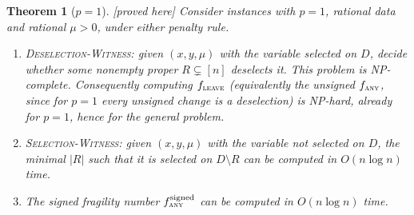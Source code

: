 \documentclass[10pt,a4paper]{article}
\theoremstyle{plain}
\newtheorem{theorem}{Theorem}[section]
\theoremstyle{definition}
\theoremstyle{remark}
\newcommand{\status}[1]{\textnormal{\textsf{\small [#1]}}}
\newcommand{\Dm}{D\setminus R}
\newcommand{\tsc}[1]{\textnormal{\textsc{#1}}}  %
\begin{document}
\begin{theorem}[$p=1$]\label{thm:hard}\status{proved here}
Consider instances with $p=1$, rational data and rational $\mu>0$, under either penalty rule.
\begin{enumerate}[label=(\alph*),leftmargin=2em]
\item \tsc{Deselection-Witness}: given $(x,y,\mu)$ with the variable selected on $D$, decide whether some nonempty proper $R\subsetneq[n]$ deselects it. This problem is NP-complete. Consequently computing $f_{\tsc{leave}}$ (equivalently the unsigned $f_{\tsc{any}}$, since for $p=1$ every unsigned change is a deselection) is NP-hard, already for $p=1$, hence for the general problem.
\item \tsc{Selection-Witness}: given $(x,y,\mu)$ with the variable not selected on $D$, the minimal $|R|$ such that it is selected on $\Dm$ can be computed in $O(n\log n)$ time.
\item The signed fragility number $f^{\mathrm{signed}}_{\tsc{any}}$ can be computed in $O(n\log n)$ time.
\end{enumerate}
\end{theorem}
\end{document}
